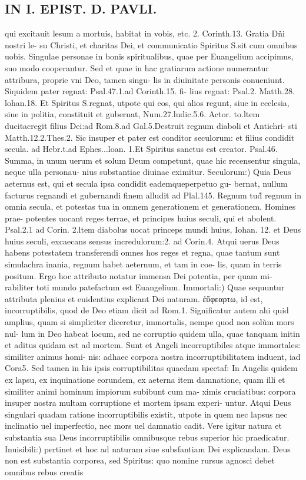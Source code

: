\documentclass{article}
\begin{document}
\begin{pages}
\section*{IN I. EPIST. D. PAVLI. }
\marginpar{[ p.58 ]}\pstart qui excitauit lesum a mortuis, habitat in vobis, etc. 2. Corinth.13. Gratia Dñi nostri le- su Christi, et charitas Dei, et communicatio Spiritus S.sit cum omnibus uobis. Singulae personae in bonis spiritualibus, quae per Euangelium accipimus, suo modo cooperantur. Sed et quae in hac gratiarum actione numerantur attribura, proprie vni Deo, tamen singu- lis in diuinitate personis conueniunt. Siquidem pater regnat: Psal.47.1.ad Corinth.15. fi- lius regnat: Psal.2. Matth.28. lohan.18. Et Spiritus S.regnat, utpote qui eos, qui alios regunt, siue in ecclesia, siue in politia, constituit et gubernat, Num.27.ludic.5.6. Actor. to.ltem ducitacregit filius Dei:ad Rom.8.ad Gal.5.Destruit regnum diaboli et Antichri- sti Matth.12.2.Thes.2. Sic insuper et pater est conditor seculorum: et filius condidit secula. ad Hebr.t.ad Ephes...loan. 1.Et Spiritus sanctus est creator. Psal.46. Summa, in unum uerum et solum Deum competunt, quae hic recensentur singula, neque  ulla personau- nius substantiae diuinae eximitur.  \pend\pstart Seculorum:) Quia Deus aeternus est, qui et secula ipsa condidit eademqueperpetuo gu- bernat, nullum facturus regnandi et gubernandi finem alludit ad Plal.145. Regnum tud̃ regnum in omnia secula, et potestas tua in omnem generationem et generationem. Homines prae- potentes uocant reges terrae, et principes huius seculi, qui et abolent. Psal.2.1 ad Corin. 2.ltem diabolus uocat princeps mundi huius, Iohan. 12. et Deus huius seculi, excaecans sensus incredulorum:2. ad Corin.4. Atqui uerus Deus habens potestatem transferendi omnes hos reges et regna, quae tantum sunt simulachra inania, regnum habet aeternum, et tam in coe- lis, quam in terris positum. Ergo hoc attributo notatur immensa Dei potentia, per quam mi- rabiliter toti mundo patefactum est Euangelium.  \pend\pstart Immortali:) Quae sequuntur attributa plenius et euidentius explicant Dei naturam. ἐὔφεαρτω, id est, incorruptibilis, quod de Deo etiam dicit ad Rom.1. Significatur autem ahi quid amplius, quam si simpliciter diceretur, immortalis, nempe quod non solùm mors nul- lum in Deo habeat locum, sed ne corruptio quidem ulla, quae tanquam initin et aditus quidam est ad mortem. Sunt et Angeli incorruptibiles atque  immortales: similiter animus homi- nis: adhaec corpora nostra incorruptibilitatem induent, iad Cora5. Sed tamen in his ipsis corruptibilitas quaedam spectaf: In Angelis quidem ex lapsu, ex inquinatione eorundem, ex aeterna item damnatione, quam illi et similiter animi hominum impiorum subibunt cum ma- ximis cruciatibus: corpora insuper nostra multam corruptione et mortem ipsam experi- untur. Atqui Deus singulari quadam ratione incorruptibilis existit, utpote in quem nec lapsus nec inclinatio uel imperfectio, nec mors uel damnatio cadit. Vere igitur natura et substantia sua Deus incorruptibilis omnibusque  rebus superior hic praedicatur.  \pend\pstart Inuisibili:) pertinet et hoc ad naturam siue subsfantiam Dei explicandam. Deus non est substantia corporea, sed Spiritus: quo nomine rursus agnosci debet omnibus rebus creatis 
\end{pages}
\end{document}
